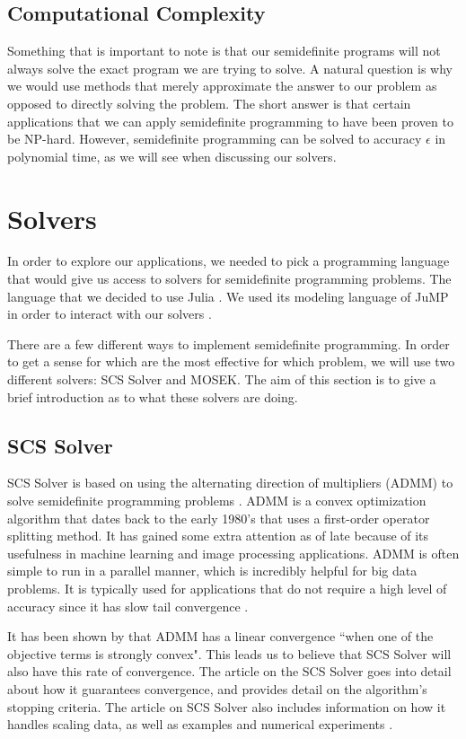 	\subsection{Computational Complexity}
	Something that is important to note is that our semidefinite programs will not always solve the exact program we are trying to solve. A natural question is why we would use methods that merely approximate the answer to our problem as opposed to directly solving the problem. The short answer is that certain applications that we can apply semidefinite programming to have been proven to be NP-hard. However, semidefinite programming can be solved to accuracy $\epsilon$ in polynomial time, as we will see when discussing our solvers.
	\section{Solvers}
	In order to explore our applications, we needed to pick a programming language that would give us access to solvers for semidefinite programming problems. The language that we decided to use Julia \cite{BEKS14}. We used its modeling language of JuMP in order to interact with our solvers \cite{DunningHuchetteLubin2015}.
	
	There are a few different ways to implement semidefinite programming. In order to get a sense for which are the most effective for which problem, we will use two different solvers: SCS Solver and MOSEK. The aim of this section is to give a brief introduction as to what these solvers are doing. 
	
	\subsection{SCS Solver}
	
	SCS Solver is based on using the alternating direction of multipliers (ADMM) to solve semidefinite programming problems \cite{ocpb:16}. ADMM is a convex optimization algorithm that dates back to the early 1980's that uses a first-order operator splitting method. It has gained some extra attention as of late because of its usefulness in machine learning and image processing applications. ADMM is often simple to run in a parallel manner, which is incredibly helpful for big data problems. It is typically used for applications that do not require a high level of accuracy since it has slow tail convergence \cite{eckstein2012augmented}.
	
	It has been shown by \cite{nishihara2015general} that ADMM has a linear convergence ``when one of the objective terms is strongly convex". This leads us to believe that SCS Solver will also have this rate of convergence. The article on the SCS Solver goes into detail about how it guarantees convergence, and provides detail on the algorithm's stopping criteria. The article on SCS Solver also includes information on how it handles scaling data, as well as examples and numerical experiments \cite{ocpb:16}. 
	
